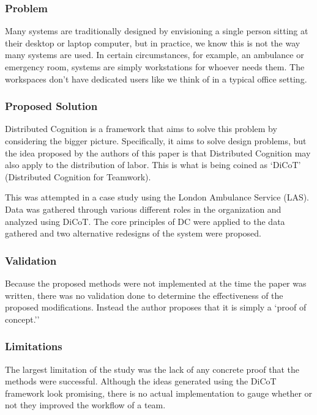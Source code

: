 \subsubsection{Problem}
Many systems are traditionally designed by envisioning a single person sitting at their desktop or laptop computer, but in practice, we know this is not the way many systems are used. In certain circumstances, for example, an ambulance or emergency room, systems are simply workstations for whoever needs them. The workspaces don't have dedicated users like we think of in a typical office setting.

\subsubsection{Proposed Solution}
Distributed Cognition is a framework that aims to solve this problem by considering the bigger picture. Specifically, it aims to solve design problems, but the idea proposed by the authors of this paper is that Distributed Cognition may also apply to the distribution of labor. This is what is being coined as `DiCoT' (Distributed Cognition for Teamwork).

This was attempted in a case study using the London Ambulance Service (LAS). Data was gathered through various different roles in the organization and analyzed using DiCoT. The core principles of DC were applied to the data gathered and two alternative redesigns of the system were proposed.

\subsubsection{Validation}
Because the proposed methods were not implemented at the time the paper was written, there was no validation done to determine the effectiveness of the proposed modifications. Instead the author proposes that it is simply a `proof of concept.''

\subsubsection{Limitations}
The largest limitation of the study was the lack of any concrete proof that the methods were successful. Although the ideas generated using the DiCoT framework look promising, there is no actual implementation to gauge whether or not they improved the workflow of a team.
